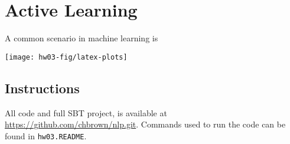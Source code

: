 \documentclass[10pt]{article}\usepackage{graphicx, color}
\newenvironment{knitrout}{}{} %
\begin{document}
\section{Active Learning}

A common scenario in machine learning is



\begin{knitrout}\small
{}\color{fgcolor}

{\centering \texttt{[image: hw03-fig/latex-plots]} 

}



\end{knitrout}


\subsection{Instructions}

All code and full SBT project, is available at \url{https://github.com/chbrown/nlp.git}. Commands used to run the code can be found in \texttt{hw03.README}.
\end{document}
